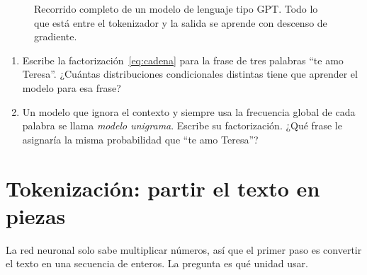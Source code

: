 \documentclass[11pt,letterpaper,oneside]{report}
\begin{document}
\begin{figure}[H]
\centering
{}
\caption{Recorrido completo de un modelo de lenguaje tipo GPT. Todo lo que está entre el tokenizador y la salida se aprende con descenso de gradiente.}
\label{fig:panorama}
\end{figure}

\begin{ejercicio}
\begin{enumerate}[label=\alph*)]
  \item Escribe la factorización~\eqref{eq:cadena} para la frase de tres palabras ``te amo Teresa''. ¿Cuántas distribuciones condicionales distintas tiene que aprender el modelo para esa frase?
  \item Un modelo que ignora el contexto y siempre usa la frecuencia global de cada palabra se llama \emph{modelo unigrama}. Escribe su factorización. ¿Qué frase le asignaría la misma probabilidad que ``te amo Teresa''?
\end{enumerate}
\end{ejercicio}

\section{Tokenización: partir el texto en piezas}\label{sec:bpe}

La red neuronal solo sabe multiplicar números, así que el primer paso es convertir el texto en una secuencia de enteros. La pregunta es qué unidad usar.
\end{document}
